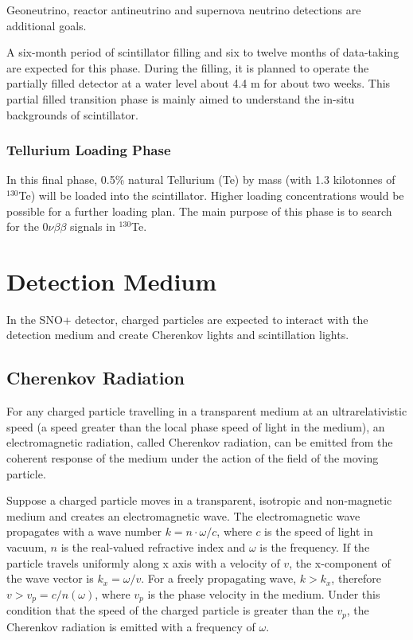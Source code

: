 Geoneutrino, reactor antineutrino and supernova neutrino detections are additional goals.

A six-month period of scintillator filling and six to twelve months of data-taking are expected for this phase. During the filling, it is planned to operate the partially filled detector at a water level about 4.4 m for about two weeks. This partial filled transition phase is mainly aimed to understand the in-situ backgrounds of scintillator. 

\subsubsection{Tellurium Loading Phase}

In this final phase, 0.5\% natural Tellurium (Te) by mass (with 1.3 kilotonnes of $^{130}$Te) will be loaded into the scintillator. Higher loading concentrations would be possible for a further loading plan\cite{Paton:2019kgy}. The main purpose of this phase is to search for the $0\nu\beta\beta$ signals in $^{130}$Te.

\section{Detection Medium}
In the SNO+ detector, charged particles are expected to interact with the detection medium and create Cherenkov lights and scintillation lights. 

\subsection{Cherenkov Radiation}
For any charged particle travelling in a transparent medium at an ultrarelativistic speed (a speed greater than the local phase speed of light in the medium), an electromagnetic radiation, called Cherenkov radiation, can be emitted from the coherent response of the medium under the action of the field of the moving particle\cite{jackson2007classical,landau2013electrodynamics}.

Suppose a charged particle moves in a transparent, isotropic and non-magnetic medium and creates an electromagnetic wave. The electromagnetic wave propagates with a wave number $k=n\cdot\omega/c$, where $c$ is the speed of light in vacuum, $n$ is the real-valued refractive index and $\omega$ is the frequency. If the particle travels uniformly along x axis with a velocity of $v$, the x-component of the wave vector is $k_x=\omega/v$. For a freely propagating wave, $k>k_x$, therefore $v>v_p=c/n(\omega)$, where $v_p$ is the phase velocity in the medium. Under this condition that the speed of the charged particle is greater than the $v_p$, the Cherenkov radiation is emitted with a frequency of $\omega$\cite{landau2013electrodynamics}.   

